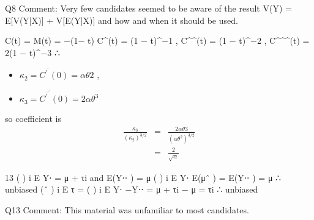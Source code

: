 \documentclass[a4paper,12pt]{article}
\begin{document}
Q8 Comment: Very few candidates seemed to be aware of the result V(Y) = E[V(Y|X)]
+ V[E(Y|X)] and how and when it should be used.



C(t) = \log M(t) = −\alpha \log(1− \theta t)
C^{\prime}(t) = \alpha\theta (1 − \theta t)^{−1} , 
C^{\prime}^{\prime}(t) = \alpha{}(1 − \theta t)^{−2} , C^{\prime}^{\prime}^{\prime}(t) = 2\alpha{}(1 − \theta t)^{−3}
∴ 

\begin{itemize}
\item $\kappa_2 = C^{\prime}^{\prime}(0) = \alpha\theta 2$ , 
\item $\kappa_3 = C^{\prime}^{\prime}^{\prime}(0) = 2\alpha\theta^3$ 
\end{itemize}

so coefficient is
\begin{eqnarray*}
\frac{\kappa_3 }{ (\kappa_2)^{3/2} } &=& \frac{2\alpha\theta 3 }{ (\alpha\theta^2)^{3/2} }\\ 
&=& \frac{2}{\sqrt{\alpha}}
\end{eqnarray*}

\newpage

13 ( ) i E Y⋅ = μ + τi and E(Y⋅⋅ ) = μ
( ) i E Y⋅ E(μˆ ) = E(Y⋅⋅ ) = μ ∴ unbiased
(ˆ ) i E τ = ( ) i E Y⋅ −Y⋅⋅ = μ + τi − μ = τi ∴ unbiased

Q13 Comment: This material was unfamiliar to most candidates.
\end{document}
